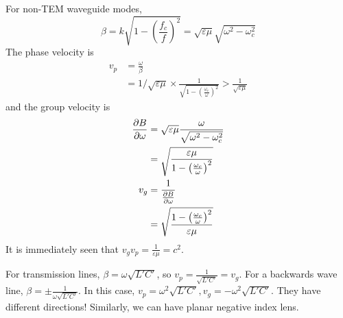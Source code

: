 \documentclass[12pt]{article}
\begin{document}
For non-TEM waveguide modes,
$$\beta = k\sqrt{1 - \left(\frac{f_c}{f}\right)^2} = \sqrt{\varepsilon\mu}\sqrt{\omega^2-\omega_c^2}$$
The phase velocity is
\begin{align*}
    v_p &= \frac{\omega}{\beta} \\
        &= 1/\sqrt{\varepsilon\mu} \times \frac{1}{\sqrt{1 - \left(\frac{\omega_c}{\omega}\right)^2}} > \frac{1}{\sqrt{\varepsilon\mu}}
\end{align*}
and the group velocity is
\begin{align*}
    \frac{\partial B}{\partial \omega} &= \sqrt{\varepsilon\mu} \frac{\omega}{\sqrt{\omega^2-\omega_c^2}} \\
                    &= \sqrt{\frac{\varepsilon\mu}{1 - \left(\frac{\omega_c}{\omega}\right)^2}} \\
    v_g &= \frac{1}{\frac{\partial B}{\partial \omega}} \\
        &= \sqrt{\frac{1 - \left(\frac{\omega_c}{\omega}\right)^2}{\varepsilon\mu}}
\end{align*}
It is immediately seen that $v_gv_p = \frac{1}{\varepsilon\mu} = c^2$.

\begin{ex}
    For transmission lines, $\beta = \omega\sqrt{L'C'}$, so $v_p = \frac{1}{\sqrt{L'C'}} = v_g$. For a backwards wave line, $\beta = \pm \frac{1}{\omega\sqrt{L'C'}}$. In this case, $v_p = \omega^2\sqrt{L'C'}, v_g = -\omega^2\sqrt{L'C'}$. They have different directions! Similarly, we can have planar negative index lens.
\end{ex}
\end{document}
